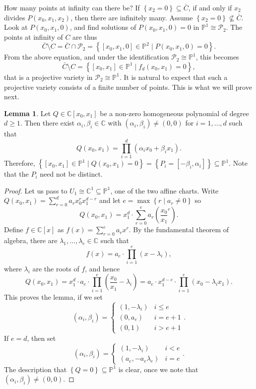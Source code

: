 \documentclass{article}
\newcommand{\C}{\mathbb{C}}
\renewcommand{\P}{\mathbb{P}}
\newcommand{\rb}[1]{\left( #1 \right)}
\renewcommand{\sb}[1]{\left[ #1 \right]}
\newcommand{\cb}[1]{\left\{ #1 \right\}}
\theoremstyle{definition}\newtheorem{definition}{Definition}[section]
\theoremstyle{definition}\newtheorem{notation}[definition]{Notation}
\theoremstyle{definition}\newtheorem{remark}[definition]{Remark}
\theoremstyle{definition}\newtheorem{example}[definition]{Example}
\theoremstyle{definition}\newtheorem{fact}{Fact}
\theoremstyle{definition}\newtheorem{exercise}{Exercise}
\newtheorem{lemma}[definition]{Lemma}
\begin{document}
How many points at infinity can there be? If $ \cb{x_2 = 0} \subseteq \bar{C} $, if and only if $ x_2 $ divides $ P\rb{x_0, x_1, x_2} $, then there are infinitely many. Assume $ \cb{x_2 = 0} \not\subseteq \bar{C} $. Look at $ P\rb{x_0, x_1, 0} $, and find solutions of $ P\rb{x_0, x_1, 0} = 0 $ in $ \P^1 \cong \mathcal{P}_2 $. The points at infinity of $ C $ are thus
$$ \bar{C} \setminus C = \bar{C} \cap \mathcal{P}_2 = \cb{\sb{x_0, x_1, 0} \in \P^2 \mid P\rb{x_0, x_1, 0} = 0}. $$
From the above equation, and under the identification $ \mathcal{P}_2 \cong \P^1 $, this becomes
$$ \bar{C} \setminus C = \cb{\sb{x_0, x_1} \in \P^1 \mid f_d\rb{x_0, x_1} = 0}, $$
that is a projective variety in $ \mathcal{P}_2 \cong \P^1 $. It is natural to expect that such a projective variety consists of a finite number of points. This is what we will prove next.

\begin{lemma}
\label{lem:6.2}
Let $ Q \in \C\sb{x_0, x_1} $ be a non-zero homogeneous polynomial of degree $ d \ge 1 $. Then there exist $ \alpha_i, \beta_i \in \C $ with $ \rb{\alpha_i, \beta_i} \ne \rb{0, 0} $ for $ i = 1, \dots, d $ such that
$$ Q\rb{x_0, x_1} = \prod_{i = 1}^d \rb{\alpha_ix_0 + \beta_ix_1}. $$
Therefore, $ \cb{\sb{x_0, x_1} \in \P^1 \mid Q\rb{x_0, x_1} = 0} = \cb{P_i = \sb{-\beta_i, \alpha_i}} \subseteq \P^1 $. Note that the $ P_i $ need not be distinct.
\end{lemma}

\begin{proof}
Let us pass to $ U_1 \cong \C^1 \subseteq \P^1 $, one of the two affine charts. Write $ Q\rb{x_0, x_1} = \sum_{r = 0}^d a_rx_0^rx_1^{d - r} $ and let $ e = \max\cb{r \mid a_r \ne 0} $ so
$$ Q\rb{x_0, x_1} = x_1^d \cdot \sum_{r = 0}^e a_r\rb{\dfrac{x_0}{x_1}^r}. $$
Define $ f \in \C\sb{x} $ as $ f\rb{x} = \sum_{r = 0}^e a_rx^r $. By the fundamental theorem of algebra, there are $ \lambda_1, \dots, \lambda_e \in \C $ such that
$$ f\rb{x} = a_e \cdot \prod_{i = 1}^e \rb{x - \lambda_i}, $$
where $ \lambda_i $ are the roots of $ f $, and hence
$$ Q\rb{x_0, x_1} = x_1^d \cdot a_e \cdot \prod_{i = 1}^e \rb{\dfrac{x_0}{x_1} - \lambda_i} = a_e \cdot x_1^{d - e} \cdot \prod_{i = 1}^e \rb{x_0 - \lambda_ix_1}. $$
This proves the lemma, if we set
$$ \rb{\alpha_i, \beta_i} = \begin{cases} \rb{1, -\lambda_i} & i \le e \\ \rb{0, a_e} & i = e + 1 \\ \rb{0, 1} & i > e + 1 \end{cases}. $$
If $ e = d $, then set
$$ \rb{\alpha_i, \beta_i} = \begin{cases} \rb{1, -\lambda_i} & i < e \\ \rb{a_e, -a_e\lambda_e} & i = e \end{cases}. $$
The description that $ \cb{Q = 0} \subseteq \P^1 $ is clear, once we note that $ \rb{\alpha_i, \beta_i} \ne \rb{0, 0} $.
\end{proof}
\end{document}
